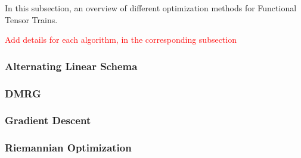 \documentclass[11pt]{article}
\begin{document}
    In this subsection, an overview of different optimization methods for Functional Tensor Trains.

    \textcolor{red}{Add details for each algorithm, in the corresponding subsection}

    \subsubsection{Alternating Linear Schema}
    \subsubsection{DMRG}
    \subsubsection{Gradient Descent}
    \subsubsection{Riemannian Optimization}
\end{document}

